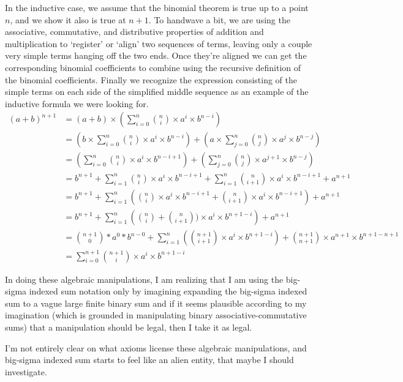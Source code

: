 \documentclass{proc-l}
\theoremstyle{definition}
\theoremstyle{remark}
\numberwithin{equation}{section}
\begin{document}
In the inductive case, we assume that the binomial theorem is true up to a point \(n\), and we show it also is true at \(n+1\). To handwave a bit, we are using the associative, commutative, and distributive properties of addition and multiplication
 to `register' or `align' two sequences of terms, leaving only a couple very simple terms hanging off the two ends.
Once they're aligned we can get the corresponding binomial coefficients to combine using the recursive definition of the binomial coefficients.
Finally we recognize the expression consisting of the simple terms on each side of the simplified middle sequence as an example of the inductive formula we were looking for.
\begin{align*}
(a + b)^{n+1} 
& = (a + b) \times (\sum_{i=0}^n {n \choose i} \times a^i \times b^{n-i}) \\ 
& = (b \times \sum_{i=0}^n {n \choose i} \times a^i \times b^{n-i}) + (a \times \sum_{j=0}^n {n \choose j} \times a^j \times b^{n-j}) \\
& = \left(\sum_{i=0}^n {n \choose i} \times a^i \times b^{n-i+1}\right) + \left(\sum_{j=0}^n {n \choose j} \times a^{j+1} \times b^{n-j}\right) \\
& = b^{n+1} + \sum_{i=1}^n {n \choose i} \times a^i \times b^{n-i+1} + \sum_{i=1}^n {n \choose i+1} \times a^i \times b^{n-i+1} + a^{n+1} \\
& = b^{n+1} + \sum_{i=1}^n \left({n \choose i} \times a^i \times b^{n-i+1} + {n \choose i+1} \times a^i \times b^{n-i+1}\right) + a^{n+1} \\
& = b^{n+1} + \sum_{i=1}^n \left({n \choose i} + {n \choose i+1}) \times a^i \times b^{n+1-i}\right) + a^{n+1} \\
& = {n+1 \choose 0} * a^0 * b^{n-0} + \sum_{i=1}^n ({n+1 \choose i+1} \times a^i \times b^{n+1-i}) + {n+1 \choose n+1} \times a^{n+1} \times b^{n+1-n+1} \\
& = \sum_{i=0}^{n+1} {n+1 \choose i} \times a^i \times b^{n+1-i}
\end{align*}

In doing these algebraic manipulations, I am realizing that I am using the big-sigma indexed sum notation only by imagining expanding the big-sigma indexed sum to a vague large finite binary sum and if it seems plausible according to my imagination (which is grounded in manipulating binary associative-commutative sums)
that a manipulation should be legal, then I take it as legal.

I'm not entirely clear on what axioms license these algebraic manipulations, and big-sigma indexed sum starts to feel like an alien entity, that maybe I should investigate.
\end{document}
